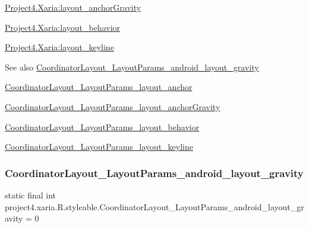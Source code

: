 {\ttfamily \hyperlink{classproject4_1_1xaria_1_1R_1_1styleable_a925c4c2bfdf0e1acd8bbc979d2aec36a}{Project4.\+Xaria\+:layout\+\_\+anchor\+Gravity}}

{\ttfamily \hyperlink{classproject4_1_1xaria_1_1R_1_1styleable_a606d268587159d1993a3fa9bfaa507e2}{Project4.\+Xaria\+:layout\+\_\+behavior}}

{\ttfamily \hyperlink{classproject4_1_1xaria_1_1R_1_1styleable_a9e5e38d49198f35609d9b905af511517}{Project4.\+Xaria\+:layout\+\_\+keyline}}

\begin{DoxySeeAlso}{See also}
\hyperlink{classproject4_1_1xaria_1_1R_1_1styleable_aa0d36210c51f5ae4879714ecc8f3fdbd}{Coordinator\+Layout\+\_\+\+Layout\+Params\+\_\+android\+\_\+layout\+\_\+gravity} 

\hyperlink{classproject4_1_1xaria_1_1R_1_1styleable_acd12b16f8a05e1b4ae6a327d285ff2e0}{Coordinator\+Layout\+\_\+\+Layout\+Params\+\_\+layout\+\_\+anchor} 

\hyperlink{classproject4_1_1xaria_1_1R_1_1styleable_a925c4c2bfdf0e1acd8bbc979d2aec36a}{Coordinator\+Layout\+\_\+\+Layout\+Params\+\_\+layout\+\_\+anchor\+Gravity} 

\hyperlink{classproject4_1_1xaria_1_1R_1_1styleable_a606d268587159d1993a3fa9bfaa507e2}{Coordinator\+Layout\+\_\+\+Layout\+Params\+\_\+layout\+\_\+behavior} 

\hyperlink{classproject4_1_1xaria_1_1R_1_1styleable_a9e5e38d49198f35609d9b905af511517}{Coordinator\+Layout\+\_\+\+Layout\+Params\+\_\+layout\+\_\+keyline} 
\end{DoxySeeAlso}
\mbox{\label{classproject4_1_1xaria_1_1R_1_1styleable_aa0d36210c51f5ae4879714ecc8f3fdbd}} 
\subsubsection{\texorpdfstring{Coordinator\+Layout\+\_\+\+Layout\+Params\+\_\+android\+\_\+layout\+\_\+gravity}{CoordinatorLayout\_LayoutParams\_android\_layout\_gravity}}
{\footnotesize\ttfamily static final int project4.\+xaria.\+R.\+styleable.\+Coordinator\+Layout\+\_\+\+Layout\+Params\+\_\+android\+\_\+layout\+\_\+gravity = 0\hspace{0.3cm}{\ttfamily [static]}}

